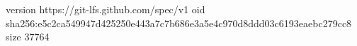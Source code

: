 version https://git-lfs.github.com/spec/v1
oid sha256:e5c2ca549947d425250e443a7c7b686e3a5e4c970d8ddd03c6193eaebc279cc8
size 37764
